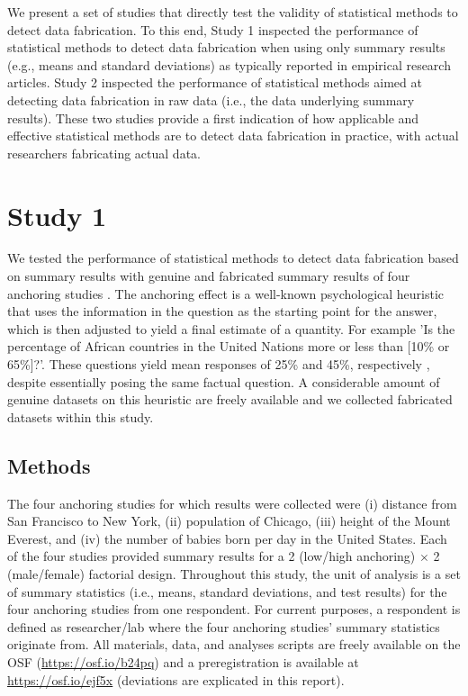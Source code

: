 \documentclass{article}
\begin{document}
We present a set of studies that directly test the validity of statistical methods to detect data fabrication. To this end, Study 1 inspected the performance of statistical methods to detect data fabrication when using only summary results (e.g., means and standard deviations) as typically reported in empirical research articles. Study 2 inspected the performance of statistical methods aimed at detecting data fabrication in raw data (i.e., the data underlying summary results). These two studies provide a first indication of how applicable and effective statistical methods are to detect data fabrication in practice, with actual researchers fabricating actual data.


\section*{Study 1}


We tested the performance of statistical methods to detect data fabrication based on summary results with genuine and fabricated summary results of four anchoring studies \citep{tversky1974,jacowitz1995}. The anchoring effect is a well-known psychological heuristic that uses the information in the question as the starting point for the answer, which is then adjusted to yield a final estimate of a quantity. For example 'Is the percentage of African countries in the United Nations more or less than [10\% or 65\%]?'. These questions yield mean responses of 25\% and 45\%, respectively \citep{tversky1974}, despite essentially posing the same factual question. A considerable amount of genuine datasets on this heuristic are freely available and we collected fabricated datasets within this study.

\subsection*{Methods}

The four anchoring studies for which results were collected were (i) distance from San Francisco to New York, (ii) population of Chicago, (iii) height of the Mount Everest, and (iv) the number of babies born per day in the United States. Each of the four studies provided summary results for a 2 (low/high anchoring) $\times$ 2 (male/female) factorial design. Throughout this study, the unit of analysis is a set of summary statistics (i.e., means, standard deviations, and test results) for the four anchoring studies from one respondent. For current purposes, a respondent is defined as researcher/lab where the four anchoring studies' summary statistics originate from. All materials, data, and analyses scripts are freely available on the OSF (\url{https://osf.io/b24pq}) and a preregistration is available at \url{https://osf.io/ejf5x} (deviations are explicated in this report).
\end{document}
